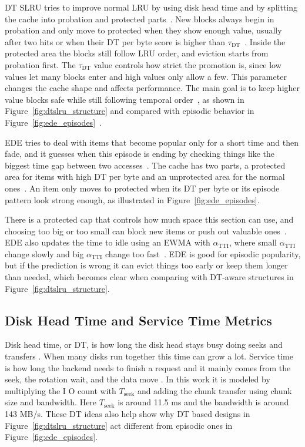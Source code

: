 \documentclass[sigconf]{acmart}
\begin{document}
DT SLRU tries to improve normal LRU by using disk head time and by splitting the cache into probation and protected parts~\cite{wong2024baleen}. New blocks always begin in probation and only move to protected when they show enough value, usually after two hits or when their DT per byte score is higher than $\tau_{\mathrm{DT}}$~\cite{Yang2022CacheSack}. Inside the protected area the blocks still follow LRU order, and eviction starts from probation first. The $\tau_{\mathrm{DT}}$ value controls how strict the promotion is, since low values let many blocks enter and high values only allow a few. This parameter changes the cache shape and affects performance. The main goal is to keep higher value blocks safe while still following temporal order~\cite{Oh2010CachingLess}, as shown in Figure~\ref{fig:dtslru_structure} and compared with episodic behavior in Figure~\ref{fig:ede_episodes}~\cite{mcallister2024fairywren}.


EDE tries to deal with items that become popular only for a short time and then fade, and it guesses when this episode is ending by checking things like the biggest time gap between two accesses~\cite{wong2024baleen}. The cache has two parts, a protected area for items with high DT per byte and an unprotected area for the normal ones~\cite{Yang2022CacheSack}. An item only moves to protected when its DT per byte or its episode pattern look strong enough, as illustrated in Figure~\ref{fig:ede_episodes}.

There is a protected cap that controls how much space this section can use, and choosing too big or too small can block new items or push out valuable ones~\cite{Oh2010CachingLess}. EDE also updates the time to idle using an EWMA with $\alpha_{\mathrm{TTI}}$, where small $\alpha_{\mathrm{TTI}}$ change slowly and big $\alpha_{\mathrm{TTI}}$ change too fast~\cite{mcallister2024fairywren}. EDE is good for episodic popularity, but if the prediction is wrong it can evict things too early or keep them longer than needed, which becomes clear when comparing with DT-aware structures in Figure~\ref{fig:dtslru_structure}.

\subsection{Disk Head Time and Service Time Metrics}
Disk head time, or DT, is how long the disk head stays busy doing seeks and transfers \cite{wong2024baleen}. When many disks run together this time can grow a lot. Service time is how long the backend needs to finish a request and it mainly comes from the seek, the rotation wait, and the data move \cite{Yang2022CacheSack}. In this work it is modeled by multiplying the I O count with $T_{\mathrm{seek}}$ and adding the chunk transfer using chunk size and bandwidth. Here $T_{\mathrm{seek}}$ is around 11.5 ms and the bandwidth is around 143 MB/s. These DT ideas also help show why DT based designs in Figure~\ref{fig:dtslru_structure} act different from episodic ones in Figure~\ref{fig:ede_episodes}.
\end{document}
